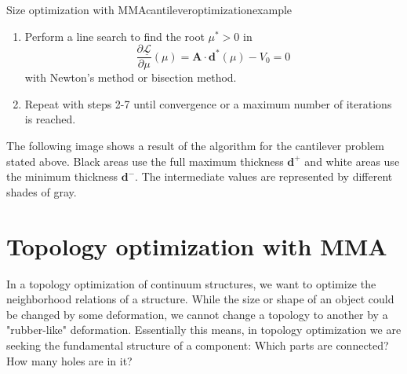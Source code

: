 \begin{example}{Size optimization with MMA}{cantileveroptimizationexample}
\begin{enumerate}
\begin{align}
{{                (L^k_j-d^k_j)^2}{\mu A_j}} \\
                \mathbf{d}^* (\mu) &= \textrm{clamp}\left(\hat{\mathbf{d}}(\mu), \tilde{\mathbf{d}}^{-,k}, \mathbf{d}^+ \right)
            \end{align}
        \item Perform a line search to find the root $\mu^*>0$ in 
        \begin{equation}
            \frac{\partial \underline{\mathcal{L}}}{\partial \mu}(\mu) = \mathbf{A} \cdot \mathbf{d}^* (\mu) - V_0  = 0
        \end{equation}
        with Newton's method or bisection method. 
        \item Repeat with steps 2-7 until convergence or a maximum number of iterations is reached.
    \end{enumerate}

    The following image shows a result of the algorithm for the cantilever problem stated above. Black areas use the full maximum thickness $\mathbf{d}^+$ and white areas use the minimum thickness $\mathbf{d}^-$. The intermediate values are represented by different shades of gray.

    \begin{center}
        
    \end{center}
    
\end{example}

\section{Topology optimization with MMA}
In a topology optimization of continuum structures, we want to optimize the neighborhood relations of a structure. While the size or shape of an object could be changed by some deformation, we cannot change a topology to another by a "rubber-like" deformation. Essentially this means, in topology optimization we are seeking the fundamental structure of a component: Which parts are connected? How many holes are in it? 

